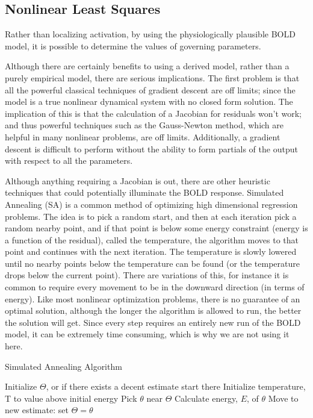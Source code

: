 \subsection{Nonlinear Least Squares}
\label{sec:Nonlinear Least Squares}
Rather than localizing activation, by using the physiologically
plausible BOLD model, it is possible to determine the values of
governing parameters.

Although there are certainly benefits to using a derived model, rather
than a purely empirical model, there are serious implications. The
first problem is that all the powerful classical techniques of gradient
descent are off limits; since the model is a true nonlinear dynamical
system with no closed form solution. The implication of this is that
the calculation of a Jacobian for residuals won't work; and thus powerful
techniques such as the Gauss-Newton method, which are helpful in many nonlinear
problems, are off limits. Additionally, a gradient descent is difficult to
perform without the ability to form partials of the output with respect
to all the parameters. 

Although anything requiring a Jacobian is out, there are other heuristic
techniques that could potentially illuminate the BOLD response. 
Simulated Annealing (SA) is a common method of optimizing high dimensional
regression problems. The idea is to pick a random start, and then
at each iteration pick a random nearby point, and if that point is
below some energy constraint (energy is a function of the residual), 
called the temperature, the algorithm moves
to that point and continues with the next iteration. The temperature
is slowly lowered until no nearby points below the temperature can
be found (or the temperature drops below the current point). There are
variations of this, for instance it is common to require every movement
to be in the downward direction (in terms of energy). Like most nonlinear
optimization problems, there is no guarantee of an optimal solution,
although the longer the algorithm is allowed to run, the better the solution
will get. Since every step requires an entirely new run of the 
BOLD model, it can be extremely time consuming, which is why we are
not using it here.

\begin{algorithm}
\caption{Simulated Annealing Algorithm}
\label{alg:Simulated Annealing}
\begin{algorithmic}
\STATE Initialize $\Theta$, or if there exists a decent estimate start there
\STATE Initialize temperature, T to value above initial energy
    \REPEAT
        \STATE Pick $\theta$ near $\Theta$
        \STATE Calculate energy, $E$, of $\theta$
    \STATE Move to new estimate: set $\Theta = \theta$
\ENDWHILE
\end{algorithmic}
\end{algorithm}

